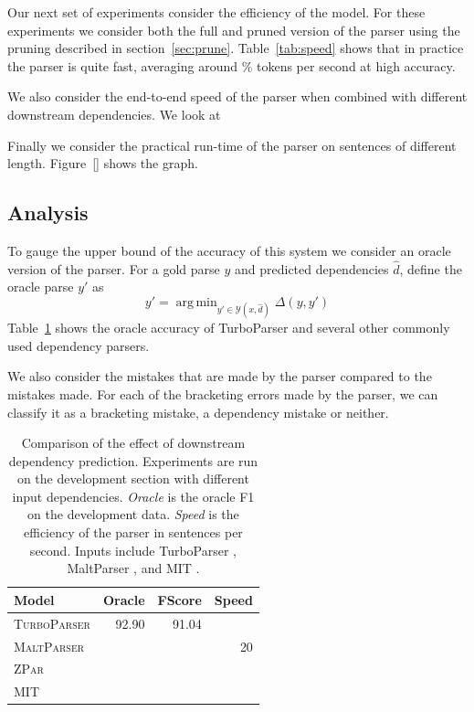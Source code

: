 \documentclass[11pt,letterpaper]{article}
\DeclareMathOperator*{\argmin}{arg\,min}
\begin{document}
Our next set of experiments consider the efficiency of the model. For these experiments we consider both the full and pruned version of the parser using the pruning described in section~\ref{sec:prune}. Table~\ref{tab:speed} shows that in practice the parser is quite fast,  averaging around \% tokens per second at high accuracy.

We also consider the end-to-end speed of the parser when combined with different downstream dependencies. We look at

Finally we consider the practical run-time of the parser on sentences of different length. Figure~\ref{} shows the graph.


\subsection{Analysis}
\label{sec:analysis}

To gauge the upper bound of the accuracy of this system we consider an oracle version of the parser. For a gold parse $y$ and predicted dependencies $\hat{d}$,  define the oracle parse $y'$ as
\[ y' = \argmin_{y' \in \mathcal{Y}(x, \hat{d})} \Delta(y, y') \]
\noindent Table~\ref{tab:oracle} shows the oracle accuracy of TurboParser and several other commonly used dependency parsers.

We also consider the mistakes that are made by the parser compared to the
mistakes made. For each of the bracketing errors made by the parser, we can classify it as a bracketing mistake, a dependency mistake or neither.

\begin{table}
  \centering
  \small

  \begin{tabular}{|l|rrr|}
    \hline
    Model & Oracle & FScore & Speed  \\
    \hline

    \hline
    \textsc{TurboParser} & 92.90 & 91.04 & \\
    \textsc{MaltParser}  & & & 20 \\
    \textsc{ZPar}        & & & \\
    \textsc{MIT}         & & & \\
    \hline
  \end{tabular}

  \vspace{0.5cm}

  \label{tab:oracle}
  \caption{Comparison of the effect of downstream dependency prediction.
    Experiments are run on the development section with different input dependencies. \textit{Oracle} is the oracle F1 on the development data. \textit{Speed} is the efficiency of the parser in sentences per second.
    Inputs include TurboParser \cite{martins2013turning}, MaltParser \cite{nivre2006maltparser}, and MIT \cite{}. }
\end{table}
\end{document}
